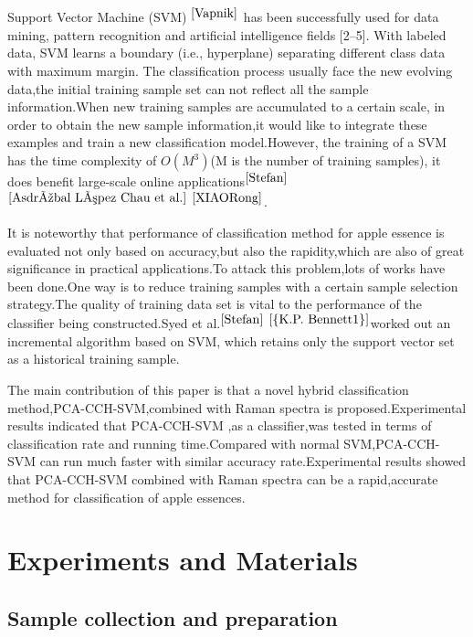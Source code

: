 \documentclass[a4paper]{article}
\begin{document}
Support Vector Machine (SVM) $^{\cite{Vapnik}}$ has been successfully used for data mining, pattern recognition and artiﬁcial intelligence ﬁelds [2–5]. With labeled data, SVM learns a boundary (i.e., hyperplane) separating different class data with maximum margin.
The classification process usually face the new evolving data,the initial training sample set can not reflect all the sample information.When new training samples are accumulated to a certain scale, in order to obtain the new sample information,it would like to integrate these examples and train a new classification model.However, the training of a SVM has the time complexity of $O(M^3)$(M is the number of training samples), it does benefit large-scale online applications$^{\cite{Stefan}}$ $^{\cite{Asdrúbal López Chau et al.}}$ $^{\cite{XIAORong}}$.

It is noteworthy that performance of classification method for apple essence is evaluated not only based on accuracy,but also the rapidity,which are also of great significance in practical applications.To attack this problem,lots of works have been done.One way is to reduce training samples with a certain sample selection strategy.The quality of training data set is vital to the performance of the classifier being constructed.Syed et al.$ ^{\cite{Stefan}}$ $ ^{\cite{{K.P. Bennett1}}}$worked out an incremental algorithm based on SVM, which retains only the support vector set as a historical training sample.

The main contribution of this paper is that a novel hybrid classification method,PCA-CCH-SVM,combined with Raman spectra is proposed.Experimental results indicated that PCA-CCH-SVM ,as a classifier,was tested in terms of classification rate and running time.Compared with normal SVM,PCA-CCH-SVM can run much faster with similar accuracy rate.Experimental results showed that PCA-CCH-SVM combined with Raman spectra can be a rapid,accurate  method for classification of apple essences.

\section{Experiments and Materials}
\subsection{Sample collection and preparation}
\end{document}
